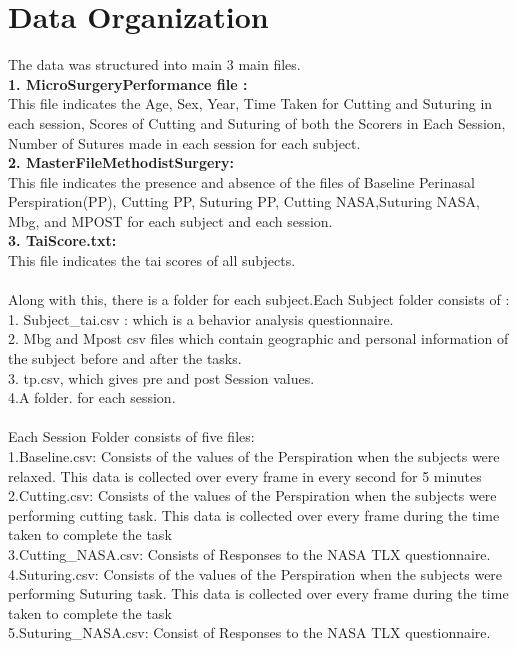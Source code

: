 \documentclass[12pt,epsf]{report}
\begin{document}
\section*{Data Organization}
{The data was structured into main 3 main files.\\
\textbf{1. MicroSurgeryPerformance file :} \\
This file indicates the Age, Sex, Year, Time Taken for Cutting and Suturing in each session, Scores of Cutting and Suturing of both the Scorers in Each Session, Number of Sutures made in each session for each subject.\\
\textbf{2. MasterFileMethodistSurgery:}\\
This file indicates the presence and absence of the files of Baseline Perinasal Perspiration(PP), Cutting PP, Suturing PP, Cutting NASA,Suturing NASA, Mbg, and MPOST for each subject and each session. \\
\textbf{3. TaiScore.txt: }\\
This file indicates the tai scores of all subjects.\\
\\
Along with this, there is a folder for each subject.Each Subject folder consists of :\\
1. Subject\_tai.csv : which is a behavior analysis questionnaire.\\
2. Mbg and Mpost csv files which contain geographic and personal information of the subject before and after the tasks.\\
3. tp.csv, which gives pre and post Session values.\\
4.A folder. for each session.\\ 
\\
Each Session Folder consists of five files:\\
1.Baseline.csv: Consists of the values of the Perspiration when the subjects were relaxed. This data is collected over every frame in every second for 5 minutes\\
2.Cutting.csv: Consists of the values of the Perspiration when the subjects were performing cutting task. This data is collected over every frame during the time taken to complete the task\\
3.Cutting\_NASA.csv: Consists of Responses to the NASA TLX questionnaire.\\
4.Suturing.csv: Consists of the values of the Perspiration when the subjects were performing Suturing task. This data is collected over every frame during the time taken to complete the task\\
5.Suturing\_NASA.csv: Consist of Responses to the NASA TLX questionnaire.}\\
\end{document}
